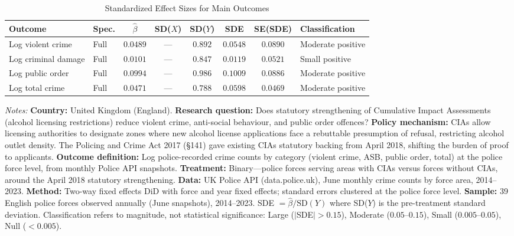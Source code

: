 \begin{table}[H]
\centering
\caption{Standardized Effect Sizes for Main Outcomes}
\label{tab:sde}
\begin{threeparttable}
\begin{adjustbox}{max width=\textwidth}
\begin{tabular}{llcccccl}
\toprule
Outcome & Spec. & $\hat{\beta}$ & SD($X$) & SD($Y$) & SDE & SE(SDE) & Classification \\
\midrule
Log violent crime & Full & $0.0489$ & --- & $0.892$ & $0.0548$ & $0.0890$ & Moderate positive \\
Log criminal damage & Full & $0.0101$ & --- & $0.847$ & $0.0119$ & $0.0521$ & Small positive \\
Log public order & Full & $0.0994$ & --- & $0.986$ & $0.1009$ & $0.0886$ & Moderate positive \\
Log total crime & Full & $0.0471$ & --- & $0.788$ & $0.0598$ & $0.0469$ & Moderate positive \\
\bottomrule
\end{tabular}
\end{adjustbox}
\par\vspace{0.3em}
\begin{minipage}{\textwidth}
\footnotesize
\textit{Notes:} \textbf{Country:} United Kingdom (England). \textbf{Research question:} Does statutory strengthening of Cumulative Impact Assessments (alcohol licensing restrictions) reduce violent crime, anti-social behaviour, and public order offences? \textbf{Policy mechanism:} CIAs allow licensing authorities to designate zones where new alcohol license applications face a rebuttable presumption of refusal, restricting alcohol outlet density. The Policing and Crime Act 2017 (\S141) gave existing CIAs statutory backing from April 2018, shifting the burden of proof to applicants. \textbf{Outcome definition:} Log police-recorded crime counts by category (violent crime, ASB, public order, total) at the police force level, from monthly Police API snapshots. \textbf{Treatment:} Binary---police forces serving areas with CIAs versus forces without CIAs, around the April 2018 statutory strengthening. \textbf{Data:} UK Police API (data.police.uk), June monthly crime counts by force area, 2014--2023. \textbf{Method:} Two-way fixed effects DiD with force and year fixed effects; standard errors clustered at the police force level. \textbf{Sample:} 39 English police forces observed annually (June snapshots), 2014--2023. SDE $= \hat{\beta} / \text{SD}(Y)$ where SD($Y$) is the pre-treatment standard deviation. Classification refers to magnitude, not statistical significance: Large ($|$SDE$| > 0.15$), Moderate ($0.05$--$0.15$), Small ($0.005$--$0.05$), Null ($< 0.005$).
\end{minipage}
\end{threeparttable}
\end{table}
